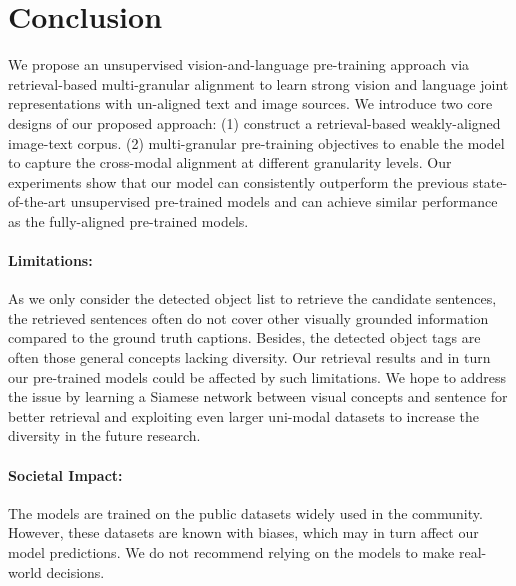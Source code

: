 \documentclass[10pt,twocolumn,letterpaper]{article}
\begin{document}
\section{Conclusion}
We propose an unsupervised vision-and-language pre-training approach via retrieval-based multi-granular alignment to learn strong vision and language joint representations with un-aligned text and image sources. We introduce two core designs of our proposed approach: (1) construct a retrieval-based weakly-aligned image-text corpus. (2) multi-granular pre-training objectives to enable the model to capture the cross-modal alignment at different granularity levels. 
Our experiments show that our model can consistently outperform the previous state-of-the-art unsupervised pre-trained models and can achieve similar performance as the fully-aligned pre-trained models. 
\vspace{-0.4cm}
\paragraph{Limitations:} 
As we only consider the detected object list to retrieve the candidate sentences, the retrieved sentences often do not cover other visually grounded information compared to the ground truth captions.
Besides, the detected object tags are often those general concepts lacking diversity. 
Our retrieval results and in turn our pre-trained models could be affected by such limitations.
We hope to address the issue by learning a Siamese network between visual concepts and sentence for better retrieval and exploiting even larger uni-modal datasets to increase the diversity in the future research.
\vspace{-0.5cm}
\paragraph{Societal Impact:} 
The models are trained on the public datasets widely used in the community.
However, these datasets are known with biases, which may in turn affect our model predictions.
We do not recommend relying on the models to make real-world decisions.
{\small


}

\clearpage
\appendix

\end{document}
